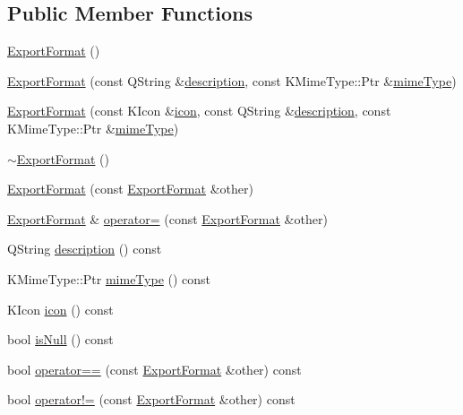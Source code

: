 \subsection*{Public Member Functions}
\begin{DoxyCompactItemize}
\item 
\hyperlink{classOkular_1_1ExportFormat_a339e9c29dbe58bf680ac06ab727614de}{Export\+Format} ()
\item 
\hyperlink{classOkular_1_1ExportFormat_a6934c2e94560a63de3fa160305eb08f9}{Export\+Format} (const Q\+String \&\hyperlink{classOkular_1_1ExportFormat_adc971794900abeb52682cb333344995a}{description}, const K\+Mime\+Type\+::\+Ptr \&\hyperlink{classOkular_1_1ExportFormat_ab37ac9aa0c65cdff5e9666e1390d79de}{mime\+Type})
\item 
\hyperlink{classOkular_1_1ExportFormat_a5d5fd0ba00326712df2736e563d73092}{Export\+Format} (const K\+Icon \&\hyperlink{classOkular_1_1ExportFormat_a9a0df83b759d906cc05cb763f2741682}{icon}, const Q\+String \&\hyperlink{classOkular_1_1ExportFormat_adc971794900abeb52682cb333344995a}{description}, const K\+Mime\+Type\+::\+Ptr \&\hyperlink{classOkular_1_1ExportFormat_ab37ac9aa0c65cdff5e9666e1390d79de}{mime\+Type})
\item 
\hyperlink{classOkular_1_1ExportFormat_a07bbf0d0f2f08f98861df7cbb94fc5a4}{$\sim$\+Export\+Format} ()
\item 
\hyperlink{classOkular_1_1ExportFormat_a9fbaac8ba935133097ed7f59840a893a}{Export\+Format} (const \hyperlink{classOkular_1_1ExportFormat}{Export\+Format} \&other)
\item 
\hyperlink{classOkular_1_1ExportFormat}{Export\+Format} \& \hyperlink{classOkular_1_1ExportFormat_ac2411c79e17ae187c92639c9ec006abb}{operator=} (const \hyperlink{classOkular_1_1ExportFormat}{Export\+Format} \&other)
\item 
Q\+String \hyperlink{classOkular_1_1ExportFormat_adc971794900abeb52682cb333344995a}{description} () const 
\item 
K\+Mime\+Type\+::\+Ptr \hyperlink{classOkular_1_1ExportFormat_ab37ac9aa0c65cdff5e9666e1390d79de}{mime\+Type} () const 
\item 
K\+Icon \hyperlink{classOkular_1_1ExportFormat_a9a0df83b759d906cc05cb763f2741682}{icon} () const 
\item 
bool \hyperlink{classOkular_1_1ExportFormat_a963d2b4cf54835cba6febc4956ad99d9}{is\+Null} () const 
\item 
bool \hyperlink{classOkular_1_1ExportFormat_a796183d731b4a280ee2ce8f6298b71b9}{operator==} (const \hyperlink{classOkular_1_1ExportFormat}{Export\+Format} \&other) const 
\item 
bool \hyperlink{classOkular_1_1ExportFormat_abac749c581c153e650fbbbcacc2ebf67}{operator!=} (const \hyperlink{classOkular_1_1ExportFormat}{Export\+Format} \&other) const 
\end{DoxyCompactItemize}
